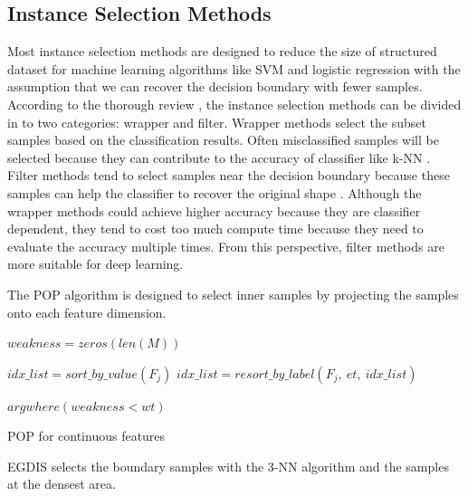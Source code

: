 \subsection{Instance Selection Methods}
Most instance selection methods are designed to reduce the size of structured dataset for machine learning algorithms like SVM and logistic regression with the assumption that we can recover the decision boundary with fewer samples. According to the thorough review \cite{Olvera-Lopez2010}, the instance selection methods can be divided in to two categories: wrapper and filter. Wrapper methods select the subset samples based on the classification results. Often misclassified samples will be selected because they can contribute to the accuracy of classifier like k-NN \cite{Aha1991}. Filter methods tend to  select samples near the decision boundary because these samples can help the classifier to recover the original shape \cite{Riquelme2003a}. Although the wrapper methods could achieve higher accuracy because they are classifier dependent, they tend to cost too much compute time because they need to evaluate the accuracy multiple times. From this perspective, filter methods are more suitable for deep learning.

The POP algorithm is designed to select inner samples by projecting the samples onto each feature dimension.

\begin{algorithm}[H]
 

$weakness = zeros(len(M))$ \;

 {
	 $idx\_list = sort\_by\_value(F_j)$ \;
	 $idx\_list = resort\_by\_label(F_j,\ et,\ idx\_list)$ \;
	 
	  {
	 }
}

\Return $argwhere(weakness < wt)$ \;

\caption{POP for continuous features}
\end{algorithm}

EGDIS selects the boundary samples with the 3-NN algorithm and the samples at the densest area.


